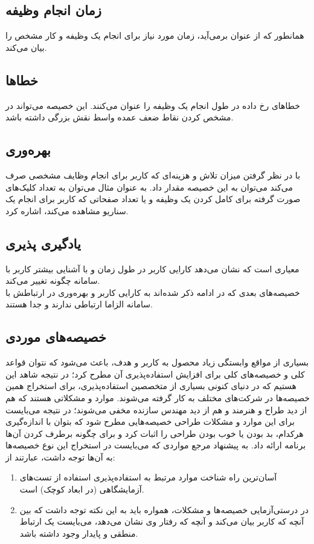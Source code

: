 \subsection{زمان انجام وظیفه}
همانطور که از عنوان برمی‌آید، زمان مورد نیاز برای انجام یک وظیفه و کار مشخص را بیان می‌کند.
\subsection{خطاها}
خطاهای رخ داده در طول انجام یک وظیفه را عنوان می‌کنند. این خصیصه می‌تواند در مشخص کردن نقاط ضعف عمده واسط نقش بزرگی داشته باشد.
\subsection{بهره‌وری}
با در نظر گرفتن میزان تلاش و هزینه‌ای که کاربر برای انجام وظایف مشخصی صرف می‌کند می‌توان به این خصیصه مقدار داد. به عنوان مثال می‌توان به تعداد کلیک‌های صورت گرفته برای کامل کردن یک وظیفه و یا تعداد صفحاتی که کاربر برای انجام یک سناریو مشاهده می‌کند، اشاره کرد.
\subsection{یادگیری پذیری}
معیاری است که نشان می‌دهد کارایی کاربر در طول زمان و با آشنایی بیشتر کاربر با سامانه چگونه تغییر می‌کند.\\
خصیصه‌های بعدی که در ادامه ذکر شده‌اند به کارایی کاربر و بهره‌وری در ارتباطش با سامانه الزاما ارتباطی ندارند و جدا هستند.
\subsection{خصیصه‌های موردی}
بسیاری از مواقع وابستگی زیاد محصول به کاربر و هدف، باعث می‌شود که نتوان قواعد کلی و خصیصه‌های کلی برای افزایش استفاده‌پذیری آن مطرح کرد؛ در نتیجه شاهد این هستیم که در دنیای کنونی بسیاری از متخصصین استفاده‌پذیری، برای استخراج همین خصیصه‌ها در شرکت‌های مختلف به کار گرفته می‌شوند. موارد و مشکلاتی هستند که هم از دید طراح و هنرمند و هم از دید مهندس سازنده مخفی می‌شوند؛ در نتیجه می‌بایست برای این موارد و مشکلات طراحی خصیصه‌هایی مطرح شود که بتوان با اندازه‌گیری هرکدام، بد بودن یا خوب بودن طراحی را اثبات کرد و برای چگونه برطرف کردن آن‌ها برنامه ارائه داد. به پیشنهاد مرجع
\cite{albert_measuring_2013}
مواردی که می‌بایست در استخراج این نوع خصیصه‌ها به آن‌ها توجه داشت، عبارتند از:
\begin{enumerate}
	\item 
	آسان‌ترین راه شناخت موارد مرتبط به استفاده‌پذیری استفاده از تست‌های آزمایشگاهی (در ابعاد کوچک) است.
	\item 
	در درستی‌آزمایی خصیصه‌ها و مشکلات، همواره باید به این نکته توجه داشت که بین آنچه که کاربر بیان می‌کند و آنچه که رفتار وی نشان می‌دهد، می‌بایست یک ارتباط منطقی و پایدار وجود داشته باشد.
\end{enumerate}
